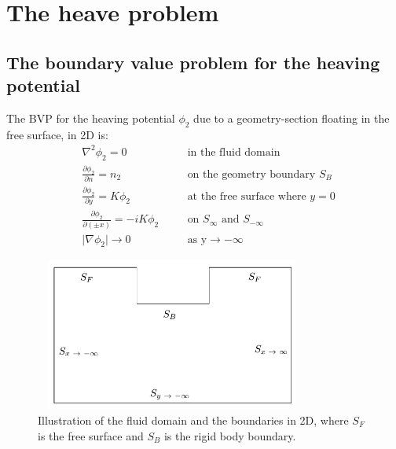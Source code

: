 \documentclass[a4paper,10pt]{article}
\newcommand{\dd}{\partial}
\begin{document}
 
 
\lstset{style=mystyle}


\section{The heave problem}
\subsection{The boundary value problem for the heaving potential}
The BVP for the heaving potential $\phi_2$ due to a geometry-section floating in the free surface, in 2D is:
\begin{align}
& \nabla^2 \phi_2 = 0 \quad && \text{in the fluid domain}\\[0.5 em]
& \frac{\dd \phi_2}{\dd n} = n_2 \quad && \text{on the geometry boundary $S_B$}\\[0.5 em]
& \frac{\dd \phi_2}{\dd y} = K \phi_2 \quad && \text{at the free surface where $y=0$}\\[0.5 em]
& \frac{\dd \phi_2}{\dd(\pm x)} = -i K \phi_2 \quad && \text{on } S_\infty \text{ and } S_{- \infty}\\[0.5 em]
& \rvert \nabla \phi_2 \rvert \rightarrow 0 \quad && \text{as y} \rightarrow - \infty
\end{align}

\begin{figure}[H]
	\centering
	\includegraphics[width=9cm, height=5cm]{illustration.png} 
	\caption{Illustration of the fluid domain and the boundaries in 2D, where $S_F$ is the free surface and $S_B$ is the rigid body boundary.}
\label{illustration}
\end{figure}
\end{document}
